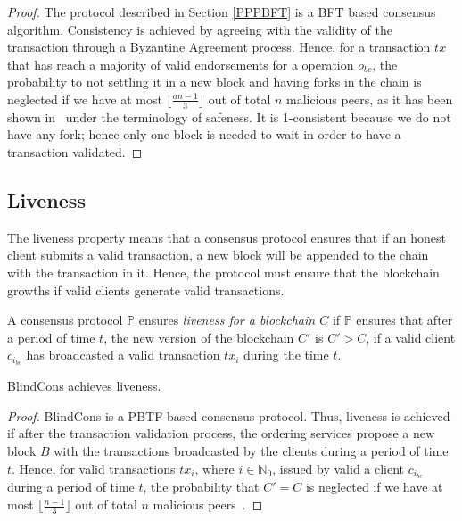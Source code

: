 \documentclass[conference]{llncs}
\newcommand{\name}{BlindCons}
\begin{document}
\begin{proof}
The protocol described in Section \ref{PPPBFT} is a BFT based consensus algorithm. Consistency is achieved by agreeing with the validity of the transaction through a Byzantine Agreement process. Hence, for a transaction $tx$ that has reach a majority of valid endorsements for a operation $o_{bc}$, the probability to not settling it in a new block and having forks in the chain is neglected if we have at most $\lfloor\frac{an-1}{3}\rfloor$ out of total $n$ malicious peers, as it has been shown in~\cite{castro1999practical,li2007beyond} under the terminology of safeness. It is 1-consistent because we do not have any fork; hence only one block is needed to wait in order to have a transaction validated.
\end{proof}

\subsection{Liveness}

The liveness property means that a consensus protocol ensures that if an honest client submits a valid transaction, a new block will be appended to the chain with the transaction in it. Hence, the protocol must ensure that the blockchain growths if valid clients generate valid transactions.

\begin{definition}[Liveness]
A consensus protocol $\mathbb{P}$ ensures \emph{liveness for a blockchain $C$} if $\mathbb{P}$ ensures that after a period of time $t$, the new version of the blockchain $C'$ is $C' > C$, if a valid client $c_{i_{bc}}$ has broadcasted a valid transaction $tx_i$ during the time $t$. 
\end{definition}

\begin{theorem}
\name{} achieves liveness.
\end{theorem}

\begin{proof}
\name{} is a PBTF-based consensus protocol. Thus, liveness is achieved if after the transaction validation process, the ordering services propose a new block $B$ with the transactions broadcasted by the clients during a period of time $t$. Hence, for valid transactions $tx_i$, where $i\in \mathbb{N}_0$, issued by valid a client $c_{i_{bc}}$ during a period of time $t$, the probability that $C'= C$ is neglected if we have at most $\lfloor\frac{n-1}{3}\rfloor$ out of total $n$ malicious peers~\cite{castro1999practical}.
\end{proof}
\end{document}
